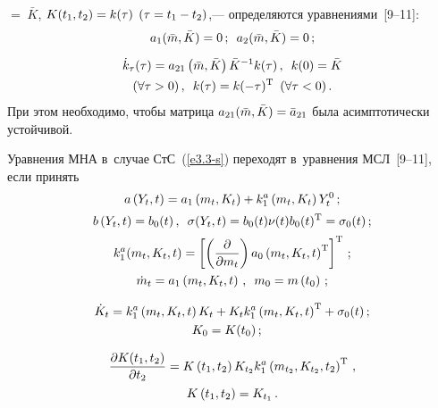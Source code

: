 \begin{multicols}{2}
\columnbreak

\noindent
$=\;\bar K$, $K(t_1, t_2) \hm=
k(\tau)$ $(\tau \hm= t_1-t_2)$,--- определяются уравнениями~[9--11]:
    \begin{equation}
    a_1 (\bar m, \bar K) =0\,;\enskip a_2 (\bar m, \bar K)=0\,;
    \label{e3.9-s}
    \end{equation}

    \vspace*{-14pt}

    \noindent
    \begin{multline}
    \dot k_\tau (\tau) = a_{21} \left(\bar m, \bar K\right)\bar K^{-1} k(\tau)\,,\enskip
    k(0) =\bar K \\
     (\forall \tau >0)\,, \enskip
    k(\tau) = k(-\tau)^{\mathrm{T}} \enskip (\forall\tau <0)\,.\label{e3.10-s}
    \end{multline}
При этом необходимо, чтобы матрица  $a_{21} (\bar m, \bar K)\hm=\bar a_{21}$ была асимптотически устойчивой.

Уравнения МНА в~случае СтС~(\ref{e3.3-s}) переходят в~уравнения МСЛ~[9--11], если принять
    \begin{gather}
    a\left(Y_t,t\right) = a_1 \left(m_t, K_t\right) + k_1^a \left(m_t, K_t\right) Y_t^0\,;\notag
   \\[1pt]
    b\left(Y_t,t\right) = b_0 (t)\,,\enskip \sigma(Y_t, t)= b_0(t) \nu(t) b_0(t)^{\mathrm{T}} = \sigma_0(t)\,;\notag   \\[1pt]
    k_1^a (m_t, K_t, t) =\left[ \left(\displaystyle\frac{\displaystyle \partial\mathstrut}{\displaystyle \partial m_t\mathstrut} \right)a_0 \left(m_t, K_t, t\right)^{\mathrm{T}}\right]^{\mathrm{T}}\,;\label{e3.11-s}
    \\
    \dot m_t = a_1 \left(m_t, K_t, t\right)\, ,\enskip m_0 = m\left(t_0\right)\,;\label{e3.12-s}
    \end{gather}

    \vspace*{-12pt}

    \noindent
    \begin{multline}
   \dot K_t = k_1^a \left(m_t, K_t, t\right) K_t + K_t k_1^a \left(m_t, K_t, t\right)^{\mathrm{T}} +\si_0(t)\,;\\
   \hspace*{-3mm}K_0 = K(t_0)\,;\label{e3.13-s}
   \end{multline}

\vspace*{-12pt}

    \noindent
    \begin{multline}
   \displaystyle\frac{\displaystyle \partial K(t_1, t_2)\mathstrut}{\displaystyle \partial t_2\mathstrut} = K\left(t_1, t_2\right) K_{t_2} k_1^a \left(m_{t_2}, K_{t_2}, t_2\right)^{\mathrm{T}}\,,\\
   K\left(t_1, t_2\right) = K_{t_1}\,.\label{e3.14-s}
   \end{multline}


\end{multicols}

